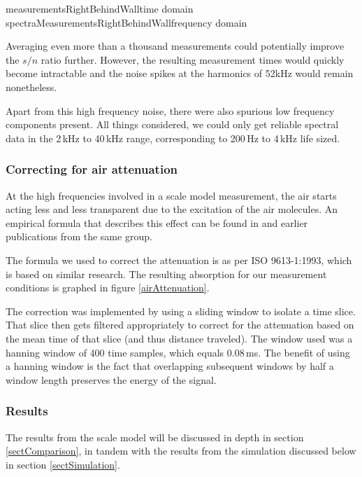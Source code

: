	{measurementsRightBehindWall}{time domain}
	{spectraMeasurementsRightBehindWall}{frequency domain}

Averaging even more than a thousand measurements could potentially improve the $s/n$ ratio further. However, the resulting measurement times would quickly become intractable and the noise spikes at the harmonics of 52kHz would remain nonetheless.

Apart from this high frequency noise, there were also spurious low frequency components present.  All things considered, we could only get reliable spectral data in the 2\,kHz to 40\,kHz range, corresponding to 200\,Hz to 4\,kHz life sized.


\subsubsection*{Correcting for air attenuation}
At the high frequencies involved in a scale model measurement, the air starts acting less and less transparent due to the excitation of the air molecules. An empirical formula that describes this effect can be found in \cite{atm-absorption-further-dev} and earlier publications from the same group.

The formula we used to correct the attenuation is as per ISO 9613-1:1993, which is based on similar research. The resulting absorption for our measurement conditions is graphed in figure \ref{airAttenuation}.


The correction was implemented by using a sliding window to isolate a time slice. That slice then gets filtered appropriately to correct for the attenuation based on the mean time of that slice (and thus distance traveled). The window used was a hanning window of 400 time samples, which equals 0.08\,ms. The benefit of using a hanning window is the fact that overlapping subsequent windows by half a window length preserves the energy of the signal.



\subsubsection*{Results}
The results from the scale model will be discussed in depth in section \ref{sectComparison}, in tandem with the results from the simulation discussed below in section \ref{sectSimulation}.


